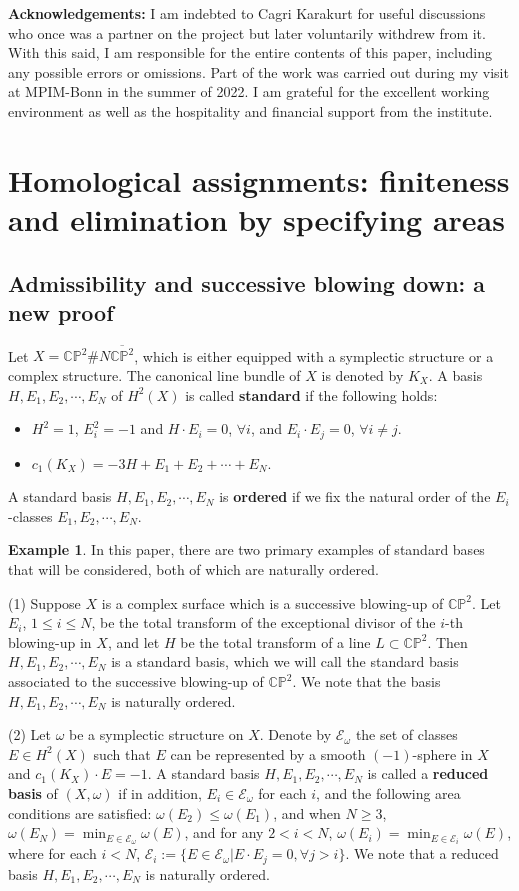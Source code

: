 \documentclass[11pt]{amsart}
\theoremstyle{plain}
\numberwithin{theorem}{section}
\theoremstyle{definition}
\newtheorem{example}[theorem]{Example}
\newcommand{\C}{{\mathbb C}}
\renewcommand{\P}{{\mathbb P}}
\newcommand{\E}{{\mathcal E}}
\begin{document}
\vspace{3mm}

{\bf Acknowledgements:} I am indebted to Cagri Karakurt for useful discussions who once was a partner on the project but later voluntarily withdrew from it. With this said, I am responsible for the entire contents of this paper, including any possible errors or omissions. Part of the work was carried out during my visit at MPIM-Bonn in the summer of 2022. I am grateful for the excellent working environment as well as the hospitality and financial support from the institute. 


\section{Homological assignments: finiteness and elimination by specifying areas} 
\subsection{Admissibility and successive blowing down: a new proof}
Let $X=\C\P^2\# N\overline{\C\P^2}$, which is either equipped with a symplectic structure or a complex structure. The canonical line bundle of $X$ is denoted by $K_X$. A basis $H, E_1, E_2,\cdots,E_N$ of $H^2(X)$ is called {\bf standard} if the following holds:
\begin{itemize}
\item $H^2=1$, $E_i^2=-1$ and $H\cdot E_i=0$, $\forall i$, and $E_i\cdot E_j=0$, $\forall i\neq j$.
\item $c_1(K_X)=-3H+E_1+E_2+\cdots+E_N$.
\end{itemize}
A standard basis $H, E_1, E_2,\cdots,E_N$ is {\bf ordered} if we fix the natural order of the $E_i$-classes $E_1, E_2,\cdots,E_N$. 

\begin{example}
In this paper, there are two primary examples of standard bases that will be considered, both of which are naturally ordered. 

(1) Suppose $X$ is a complex surface which is a successive blowing-up of $\C\P^2$. Let $E_i$, 
$1\leq i\leq N$, be the total transform of the exceptional divisor of the $i$-th blowing-up in $X$, and let $H$ be the total transform of a line $L\subset \C\P^2$. Then $H, E_1,E_2,\cdots,E_N$ is a standard basis, which we will call the standard basis associated to the successive blowing-up of $\C\P^2$. We note that the basis 
$H, E_1,E_2,\cdots,E_N$ is naturally ordered. 

(2) Let $\omega$ be a symplectic structure on $X$. Denote by $\E_\omega$ the set of classes $E\in H^2(X)$ such that $E$ can be represented by a smooth $(-1)$-sphere in $X$ and 
$c_1(K_X)\cdot E=-1$. A standard basis $H,E_1,E_2,\cdots,E_N$ is called a 
{\bf reduced basis} of $(X,\omega)$ if in addition, $E_i\in \E_\omega$ for each $i$, and the following area conditions are satisfied: $\omega(E_2)\leq \omega(E_1)$, and when $N\geq 3$,
$\omega(E_N)=\min_{E\in\E_\omega}\omega(E)$, and for any $2<i<N$, 
$\omega(E_i)=\min_{E\in\E_i}\omega(E)$, where for each $i<N$, 
$\E_i:= \{E\in \E_\omega|E\cdot E_j=0, \forall j>i\}$. We note that a reduced basis 
$H,E_1,E_2,\cdots,E_N$ is naturally ordered. 
\end{example}
\end{document}
